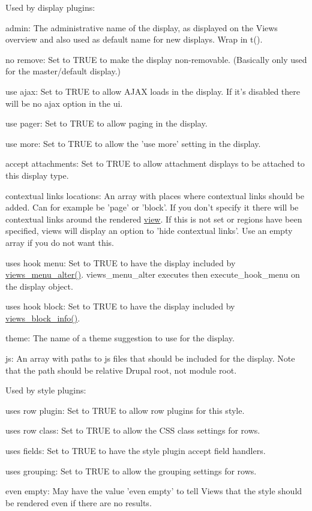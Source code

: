 \begin{DoxyItemize}
\item Used by display plugins:
\begin{DoxyItemize}
\item admin: The administrative name of the display, as displayed on the Views overview and also used as default name for new displays. Wrap in t().
\item no remove: Set to TRUE to make the display non-\/removable. (Basically only used for the master/default display.)
\item use ajax: Set to TRUE to allow AJAX loads in the display. If it's disabled there will be no ajax option in the ui.
\item use pager: Set to TRUE to allow paging in the display.
\item use more: Set to TRUE to allow the 'use more' setting in the display.
\item accept attachments: Set to TRUE to allow attachment displays to be attached to this display type.
\item contextual links locations: An array with places where contextual links should be added. Can for example be 'page' or 'block'. If you don't specify it there will be contextual links around the rendered \hyperlink{classview}{view}. If this is not set or regions have been specified, views will display an option to 'hide contextual links'. Use an empty array if you do not want this.
\item uses hook menu: Set to TRUE to have the display included by \hyperlink{views_8module_a927f922bf3e583010e7deb46db1cbb4e}{views\_\-menu\_\-alter()}. views\_\-menu\_\-alter executes then execute\_\-hook\_\-menu on the display object.
\item uses hook block: Set to TRUE to have the display included by \hyperlink{views_8module_a394aa81d1c40be16ebc29acb2fdae0fc}{views\_\-block\_\-info()}.
\item theme: The name of a theme suggestion to use for the display.
\item js: An array with paths to js files that should be included for the display. Note that the path should be relative Drupal root, not module root.
\end{DoxyItemize}
\end{DoxyItemize}


\begin{DoxyItemize}
\item Used by style plugins:
\begin{DoxyItemize}
\item uses row plugin: Set to TRUE to allow row plugins for this style.
\item uses row class: Set to TRUE to allow the CSS class settings for rows.
\item uses fields: Set to TRUE to have the style plugin accept field handlers.
\item uses grouping: Set to TRUE to allow the grouping settings for rows.
\item even empty: May have the value 'even empty' to tell Views that the style should be rendered even if there are no results.
\end{DoxyItemize}
\end{DoxyItemize}


